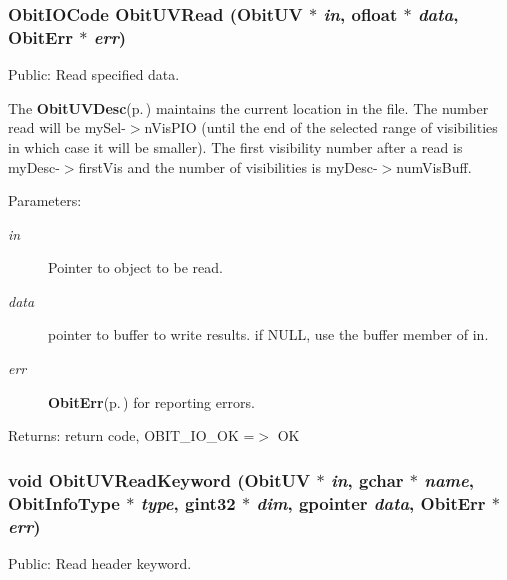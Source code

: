 \subsubsection{\setlength{\rightskip}{0pt plus 5cm}Obit\-IOCode Obit\-UVRead ({\bf Obit\-UV} $\ast$ {\em in}, {\bf ofloat} $\ast$ {\em data}, {\bf Obit\-Err} $\ast$ {\em err})}\label{ObitUV_8h_a37}


Public: Read specified data. 

The {\bf Obit\-UVDesc}{\rm (p.\,\pageref{structObitUVDesc})} maintains the current location in the file. The number read will be my\-Sel-$>$n\-Vis\-PIO (until the end of the selected range of visibilities in which case it will be smaller). The first visibility number after a read is my\-Desc-$>$first\-Vis and the number of visibilities is my\-Desc-$>$num\-Vis\-Buff. \begin{Desc}
\item[Parameters:]
\begin{description}
\item[{\em in}]Pointer to object to be read. \item[{\em data}]pointer to buffer to write results. if NULL, use the buffer member of in. \item[{\em err}]{\bf Obit\-Err}{\rm (p.\,\pageref{structObitErr})} for reporting errors. \end{description}
\end{Desc}
\begin{Desc}
\item[Returns:]return code, OBIT\_\-IO\_\-OK =$>$ OK \end{Desc}
\subsubsection{\setlength{\rightskip}{0pt plus 5cm}void Obit\-UVRead\-Keyword ({\bf Obit\-UV} $\ast$ {\em in}, gchar $\ast$ {\em name}, Obit\-Info\-Type $\ast$ {\em type}, gint32 $\ast$ {\em dim}, gpointer {\em data}, {\bf Obit\-Err} $\ast$ {\em err})}\label{ObitUV_8h_a54}


Public: Read header keyword. 

